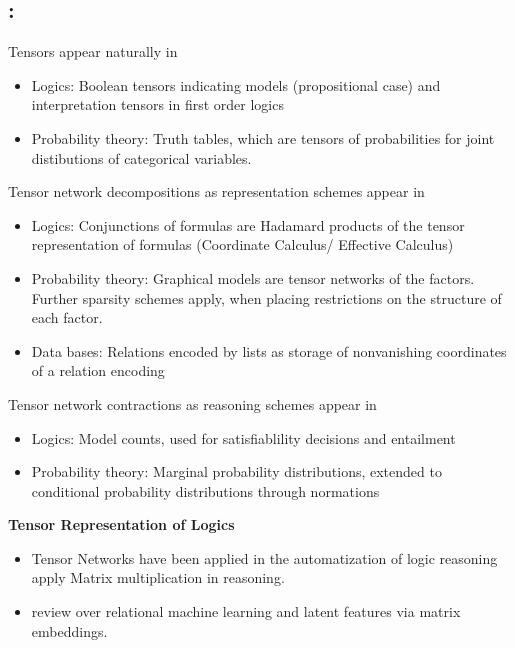 \subsection{: \partonetext}

Tensors appear naturally in
\begin{itemize}
    \item Logics: Boolean tensors indicating models (propositional case) and interpretation tensors in first order logics
    \item Probability theory: Truth tables, which are tensors of probabilities for joint distibutions of categorical variables.
\end{itemize}

Tensor network decompositions as representation schemes appear in
\begin{itemize}
    \item Logics: Conjunctions of formulas are Hadamard products of the tensor representation of formulas (Coordinate Calculus/ Effective Calculus)
    \item Probability theory: Graphical models are tensor networks of the factors. Further sparsity schemes apply, when placing restrictions on the structure of each factor.
    \item Data bases: Relations encoded by lists as storage of nonvanishing coordinates of a relation encoding
\end{itemize}

Tensor network contractions as reasoning schemes appear in
\begin{itemize}
    \item Logics: Model counts, used for satisfiablility decisions and entailment
    \item Probability theory: Marginal probability distributions, extended to conditional probability distributions through normations
\end{itemize}


\textbf{Tensor Representation of Logics}
\begin{itemize}
    \item Tensor Networks have been applied in the automatization of logic reasoning \cite{li_linear_2017, sato_linear_2017} apply Matrix multiplication in reasoning.
    \item \cite{nickel_review_2016} review over relational machine learning and latent features via matrix embeddings.
\end{itemize}

